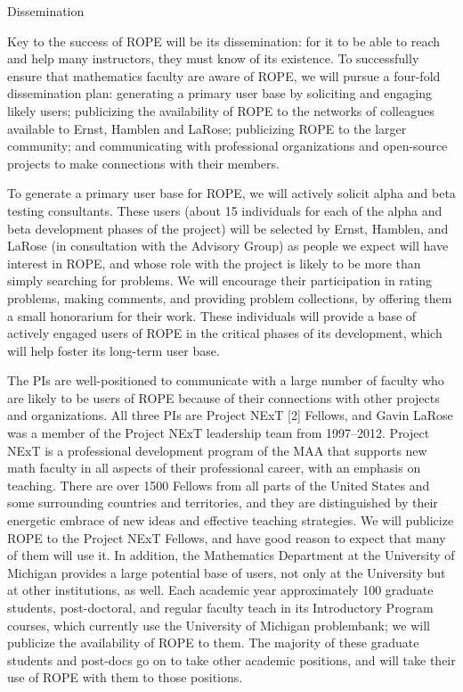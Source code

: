 \documentclass[11pt]{article}
\begin{document}
\begin{section}{Dissemination}

Key to the success of ROPE will be its dissemination: for it to be able
to reach and help many instructors, they must know of its existence.  To
successfully ensure that mathematics faculty are aware of ROPE, we will
pursue a four-fold dissemination plan: generating a primary user base by
soliciting and engaging likely users; publicizing the availability of ROPE to the networks of colleagues available to Ernst, Hamblen and
LaRose; publicizing ROPE to the larger community; and communicating
with professional organizations and open-source projects to make
connections with their members.

To generate a primary user base for ROPE, we will actively solicit
alpha and beta testing consultants.  These users (about 15
individuals for each of the alpha and beta development phases of the
project) will be selected by Ernst, Hamblen, and LaRose (in consultation
with the Advisory Group) as people we expect will have interest in ROPE, and whose role with the project is likely to be more than simply
searching for problems.  We will encourage their participation in rating
problems, making comments, and providing problem collections, by offering them a
small honorarium for their work.  These individuals will provide a
base of actively engaged users of ROPE in the critical phases
of its development, which will help foster its long-term user base.

The PIs are well-positioned to communicate
with a large number of faculty who are likely to be users of ROPE
because of their connections with other projects and organizations.  All
three PIs are Project NExT [2]
Fellows, and Gavin LaRose was a member of the Project NExT leadership team
from 1997--2012.
Project NExT is a professional development program of the MAA that
supports new math faculty in all aspects of their professional career,
with an emphasis on teaching.  There are over 1500 Fellows from all parts
of the United States and some surrounding countries and territories, and
they are distinguished by their energetic embrace of new ideas and
effective teaching strategies.  We will publicize ROPE to the Project
NExT Fellows, and have good reason to expect that many of them will use
it.  In addition, the Mathematics Department at 
the University of Michigan provides a large potential base of users, not
only at the University but at other institutions, as well.  Each academic
year approximately 100 graduate students, post-doctoral, and regular
faculty teach in its Introductory Program courses, which currently use the
University of Michigan problembank; we will publicize
the availability of ROPE to them.  The majority of these graduate
students and post-docs go on to take other academic positions, and will
take their use of ROPE with them to those positions.


\end{section}
\end{document}
